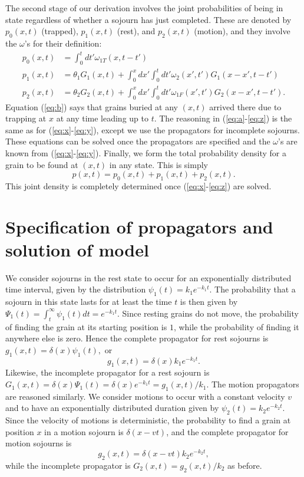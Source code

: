 \documentclass[]{agujournal2018}
\newcommand\be{\begin{equation}}
\newcommand\ee{\end{equation}}
\begin{document}
The second stage of our derivation involves the joint probabilities of being in state regardless of whether a sojourn has just completed. These are denoted by  $p_0(x,t)$ (trapped), $p_1(x,t)$ (rest), and $p_2(x,t)$ (motion), and they involve the $\omega$'s for their definition:
\begin{align}
p_0(x,t) &= \int_0^t dt' \omega_{1T}(x,t-t') \label{eq:b}\\
p_1(x,t) &= \theta_1 G_1(x,t) + \int_0^x dx' \int_0^t dt' \omega_2(x',t')G_1(x-x',t-t')\label{eq:a}\\
p_2(x,t) &= \theta_2 G_2(x,t) + \int_0^x dx' \int_0^t dt'  \omega_{1F}(x',t')G_2(x-x',t-t').\label{eq:z}
\end{align}
Equation (\ref{eq:b}) says that grains buried at any $(x,t)$ arrived there due to trapping at $x$ at any time leading up to $t$.
The reasoning in (\ref{eq:a}-\ref{eq:z}) is the same as for (\ref{eq:x}-\ref{eq:y}), except we use the propagators for incomplete sojourns.
These equations can be solved once the propagators are specified and the $\omega$'s are known from (\ref{eq:x}-\ref{eq:y}).
Finally, we form the total probability density for a grain to be found at $(x,t)$ in any state.
This is simply 
\be p(x,t) = p_0(x,t) + p_1(x,t) + p_2(x,t). \label{eq:dist}\ee
This joint density is completely determined once (\ref{eq:x}-\ref{eq:z}) are solved.


\section{Specification of propagators and solution of model}
\label{sec:solution}
We consider sojourns in the rest state to occur for an exponentially distributed time interval, given by the distribution $\psi_1(t) = k_1 e^{-k_1t}.$
The probability that a sojourn in this state lasts for at least the time $t$ is then given by $\Psi_1(t) = \int_t^\infty \psi_1(t)dt = e^{-k_1 t}$.
Since resting grains do not move, the probability of finding the grain at its starting position is $1$, while the probability of finding it anywhere else is zero.
Hence the complete propagator for rest sojourns is $g_1(x,t) = \delta(x)\psi_1(t),$ or 
\be g_1(x,t) = \delta(x)k_1e^{-k_1t}.\label{eq:prop1} \ee
Likewise, the incomplete propagator for a rest sojourn is $G_1(x,t) = \delta(x)\Psi_1(t) = \delta(x)e^{-k_1t} = g_1(x,t)/k_1.$
The motion propagators are reasoned similarly.
We consider motions to occur with a constant velocity $v$ and to have an exponentially distributed duration given by $\psi_2(t) = k_2 e^{-k_2t}.$
Since the velocity of motions is deterministic, the probability to find a grain at position $x$ in a motion sojourn is $\delta(x-vt)$, and the complete propagator for motion sojourns is 
\be g_2(x,t) = \delta(x-vt)k_2e^{-k_2t},\label{eq:prop2}\ee
while the incomplete propagator is $G_2(x,t) = g_2(x,t)/k_2$ as before.
\end{document}
